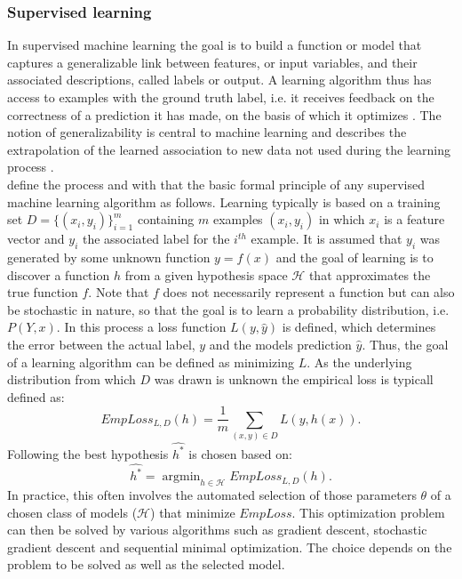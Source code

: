 \subsubsection{Supervised learning}
In supervised machine learning the goal is to build a function or model that captures a generalizable link between features, or input variables, and their associated descriptions, called labels or output. A learning algorithm thus has access to examples with the ground truth label, i.e. it receives feedback on the correctness of a prediction it has made, on the basis of which it optimizes \cite{Russell2015}. The notion of generalizability is central to machine learning and describes the extrapolation of the learned association to new data not used during the learning process \cite{Mohri2018}.\\ 
\cite{Russell2015} define the process and with that the basic formal principle of any supervised machine learning algorithm as follows. Learning typically is based on a training set $D=\{(x_i, y_i)\}_{i=1}^{m}$ containing $m$ examples $(x_i , y_i)$ in which $x_i$ is a feature vector and $y_i$ the associated label for the \({i}^{th}\) example. It is assumed that $y_i$ was generated by some unknown function $y=f(x)$ and the goal of learning is to discover a function $h$ from a given hypothesis space $\mathcal{H}$ that approximates the true function $f$. Note that $f$ does not necessarily represent a function but can also be stochastic in nature, so that the goal is to learn a probability distribution, i.e. $P(Y,x)$. In this process a loss function $L(y,\hat{y})$ is defined, which determines the error between the actual label, $y$ and the models prediction $\hat{y}$. Thus, the goal of a learning algorithm can be defined as minimizing $L$. As the underlying distribution from which $D$ was drawn is unknown the empirical loss is typicall defined as: 
\begin{equation}
EmpLoss_{L,D}(h)=\frac{1}{m}\sum_{(x,y)\in{D}}L(y,h(x)) .
\end{equation}
Following the best hypothesis $\hat{h^*}$ is chosen based on: 
\begin{equation}
\hat{h^*}=\operatorname{argmin}_{h\in{\mathcal{H}}}EmpLoss_{L,D}(h) .
\end{equation}
In practice, this often involves the automated selection of those parameters $\theta$ of a chosen class of models ($\mathcal{H}$) that minimize $EmpLoss$. This optimization problem can then be solved by various algorithms such as gradient descent, stochastic gradient descent and sequential minimal optimization. The choice depends on the problem to be solved as well as the selected model. 

